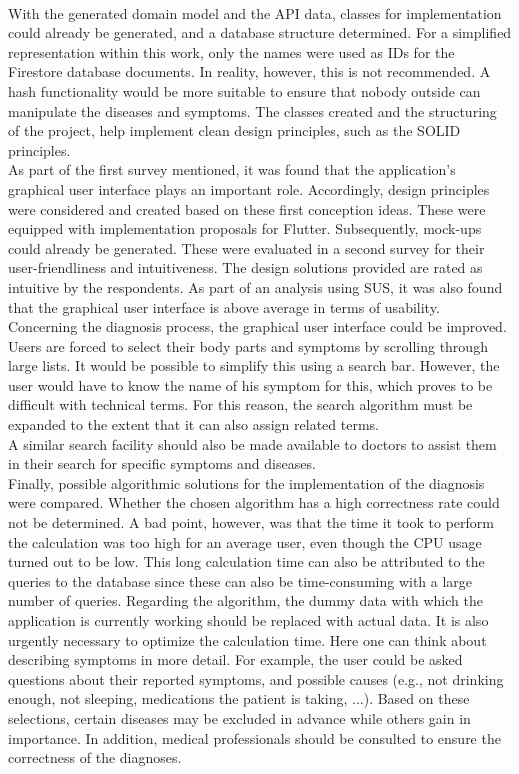 \newline \\
With the generated domain model and the API data, classes for implementation could already be generated, and a database structure determined. For a simplified representation within this work, only the names were used as IDs for the Firestore database documents. In reality, however, this is not recommended. A hash functionality would be more suitable to ensure that nobody outside can manipulate the diseases and symptoms. The classes created and the structuring of the project, help implement clean design principles, such as the SOLID principles.
\newline \\
As part of the first survey mentioned, it was found that the application's graphical user interface plays an important role. Accordingly, design principles were considered and created based on these first conception ideas. These were equipped with implementation proposals for Flutter. Subsequently, mock-ups could already be generated. These were evaluated in a second survey for their user-friendliness and intuitiveness. The design solutions provided are rated as intuitive by the respondents. As part of an analysis using SUS, it was also found that the graphical user interface is above average in terms of usability. Concerning the diagnosis process, the graphical user interface could be improved. Users are forced to select their body parts and symptoms by scrolling through large lists. It would be possible to simplify this using a search bar. However, the user would have to know the name of his symptom for this, which proves to be difficult with technical terms. For this reason, the search algorithm must be expanded to the extent that it can also assign related terms.
\newline \\
A similar search facility should also be made available to doctors to assist them in their search for specific symptoms and diseases.
\newline \\
Finally, possible algorithmic solutions for the implementation of the diagnosis were compared. Whether the chosen algorithm has a high correctness rate could not be determined. A bad point, however, was that the time it took to perform the calculation was too high for an average user, even though the CPU usage turned out to be low. This long calculation time can also be attributed to the queries to the database since these can also be time-consuming with a large number of queries. Regarding the algorithm, the dummy data with which the application is currently working should be replaced with actual data. It is also urgently necessary to optimize the calculation time. Here one can think about describing symptoms in more detail. For example, the user could be asked questions about their reported symptoms, and possible causes (e.g., not drinking enough, not sleeping, medications the patient is taking, ...). Based on these selections, certain diseases may be excluded in advance while others gain in importance. In addition, medical professionals should be consulted to ensure the correctness of the diagnoses. 
